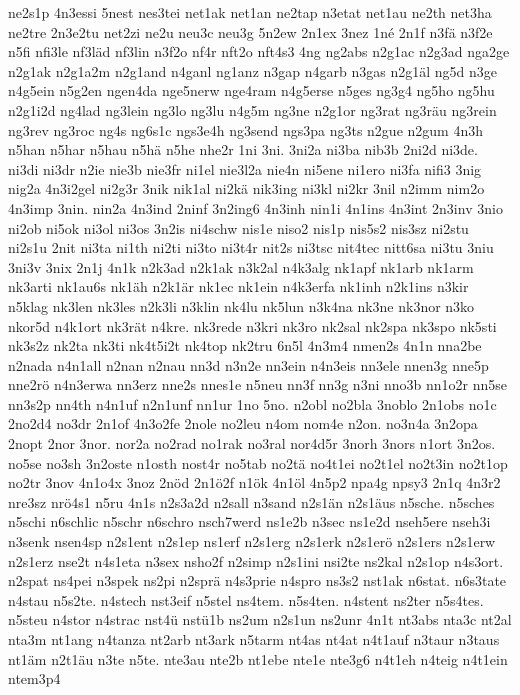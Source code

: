 {ne2s1p
4n3essi
5nest
nes3tei
net1ak
net1an
ne2tap
n3etat
net1au
ne2th
net3ha
ne2tre
2n3e2tu
net2zi
ne2u
neu3c
neu3g
5n2ew
2n1ex
3nez
1né
2n1f
n3fä
n3f2e
n5fi
nfi3le
nf3läd
nf3lin
n3f2o
nf4r
nft2o
nft4s3
4ng
ng2abs
n2g1ac
n2g3ad
nga2ge
n2g1ak
n2g1a2m
n2g1and
n4ganl
ng1anz
n3gap
n4garb
n3gas
n2g1äl
ng5d
n3ge
n4g5ein
n5g2en
ngen4da
nge5nerw
nge4ram
n4g5erse
n5ges
ng3g4
ng5ho
ng5hu
n2g1i2d
ng4lad
ng3lein
ng3lo
ng3lu
n4g5m
ng3ne
n2g1or
ng3rat
ng3räu
ng3rein
ng3rev
ng3roc
ng4s
ng6s1c
ngs3e4h
ng3send
ngs3pa
ng3ts
n2gue
n2gum
4n3h
n5han
n5har
n5hau
n5hä
n5he
nhe2r
1ni
3ni.
3ni2a
ni3ba
nib3b
2ni2d
ni3de.
ni3di
ni3dr
n2ie
nie3b
nie3fr
ni1el
nie3l2a
nie4n
ni5ene
ni1ero
ni3fa
nifi3
3nig
nig2a
4n3i2gel
ni2g3r
3nik
nik1al
ni2kä
nik3ing
ni3kl
ni2kr
3nil
n2imm
nim2o
4n3imp
3nin.
nin2a
4n3ind
2ninf
3n2ing6
4n3inh
nin1i
4n1ins
4n3int
2n3inv
3nio
ni2ob
ni5ok
ni3ol
ni3os
3n2is
ni4schw
nis1e
niso2
nis1p
nis5s2
nis3sz
ni2stu
ni2s1u
2nit
ni3ta
ni1th
ni2ti
ni3to
ni3t4r
nit2s
ni3tsc
nit4tec
nitt6sa
ni3tu
3niu
3ni3v
3nix
2n1j
4n1k
n2k3ad
n2k1ak
n3k2al
n4k3alg
nk1apf
nk1arb
nk1arm
nk3arti
nk1au6s
nk1äh
n2k1är
nk1ec
nk1ein
n4k3erfa
nk1inh
n2k1ins
n3kir
n5klag
nk3len
nk3les
n2k3li
n3klin
nk4lu
nk5lun
n3k4na
nk3ne
nk3nor
n3ko
nkor5d
n4k1ort
nk3rät
n4kre.
nk3rede
n3kri
nk3ro
nk2sal
nk2spa
nk3spo
nk5sti
nk3s2z
nk2ta
nk3ti
nk4t5i2t
nk4top
nk2tru
6n5l
4n3m4
nmen2s
4n1n
nna2be
n2nada
n4n1all
n2nan
n2nau
nn3d
n3n2e
nn3ein
n4n3eis
nn3ele
nnen3g
nne5p
nne2rö
n4n3erwa
nn3erz
nne2s
nnes1e
n5neu
nn3f
nn3g
n3ni
nno3b
nn1o2r
nn5se
nn3s2p
nn4th
n4n1uf
n2n1unf
nn1ur
1no
5no.
n2obl
no2bla
3noblo
2n1obs
no1c
2no2d4
no3dr
2n1of
4n3o2fe
2nole
no2leu
n4om
nom4e
n2on.
no3n4a
3n2opa
2nopt
2nor
3nor.
nor2a
no2rad
no1rak
no3ral
nor4d5r
3norh
3nors
n1ort
3n2os.
no5se
no3sh
3n2oste
n1osth
nost4r
no5tab
no2tä
no4t1ei
no2t1el
no2t3in
no2t1op
no2tr
3nov
4n1o4x
3noz
2nöd
2n1ö2f
n1ök
4n1öl
4n5p2
npa4g
npsy3
2n1q
4n3r2
nre3sz
nrö4s1
n5ru
4n1s
n2s3a2d
n2sall
n3sand
n2s1än
n2s1äus
n5sche.
n5sches
n5schi
n6schlic
n5schr
n6schro
nsch7werd
ns1e2b
n3sec
ns1e2d
nseh5ere
nseh3i
n3senk
nsen4sp
n2s1ent
n2s1ep
ns1erf
n2s1erg
n2s1erk
n2s1erö
n2s1ers
n2s1erw
n2s1erz
nse2t
n4s1eta
n3sex
nsho2f
n2simp
n2s1ini
nsi2te
ns2kal
n2s1op
n4s3ort.
n2spat
ns4pei
n3spek
ns2pi
n2sprä
n4s3prie
n4spro
ns3s2
nst1ak
n6stat.
n6s3tate
n4stau
n5s2te.
n4stech
nst3eif
n5stel
ns4tem.
n5s4ten.
n4stent
ns2ter
n5s4tes.
n5steu
n4stor
n4strac
nst4ü
nstü1b
ns2um
n2s1un
ns2unr
4n1t
nt3abs
nta3c
nt2al
nta3m
nt1ang
n4tanza
nt2arb
nt3ark
n5tarm
nt4as
nt4at
n4t1auf
n3taur
n3taus
nt1äm
n2t1äu
n3te
n5te.
nte3au
nte2b
nt1ebe
nte1e
nte3g6
n4t1eh
n4teig
n4t1ein
ntem3p4
}
